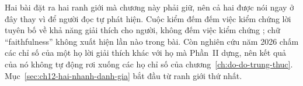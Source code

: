 Hai bài đặt ra hai ranh giới mà chương này phải giữ, nên cả hai được nói ngay ở
đây thay vì để người đọc tự phát hiện. Cuộc kiểm đếm đếm việc kiểm chứng lời
tuyên bố về khả năng giải thích cho người, không đếm việc kiểm chứng ; chữ \enquote{faithfulness} không xuất hiện lần nào trong bài. Còn nghiên
cứu năm 2026 chấm các chỉ số của một họ lời giải thích khác với họ mà Phần~II
dựng, nên kết quả của nó không tự động rơi xuống các họ chỉ số của
chương~\ref{ch:do-do-trung-thuc}. Mục~\ref{sec:ch12-hai-nhanh-danh-gia} bắt đầu
từ ranh giới thứ nhất.









